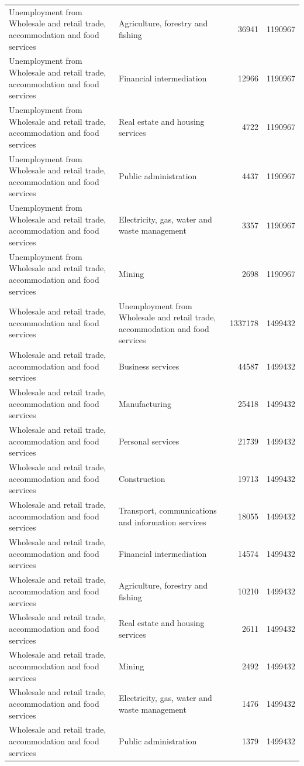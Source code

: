 \begin{longtable}{llrr}
Unemployment from Wholesale and retail trade, accommodation and food services & Agriculture, forestry and fishing & 36941 & 1190967 \\
Unemployment from Wholesale and retail trade, accommodation and food services & Financial intermediation & 12966 & 1190967 \\
Unemployment from Wholesale and retail trade, accommodation and food services & Real estate and housing services & 4722 & 1190967 \\
Unemployment from Wholesale and retail trade, accommodation and food services & Public administration & 4437 & 1190967 \\
Unemployment from Wholesale and retail trade, accommodation and food services & Electricity, gas, water and waste management & 3357 & 1190967 \\
Unemployment from Wholesale and retail trade, accommodation and food services & Mining & 2698 & 1190967 \\
Wholesale and retail trade, accommodation and food services & Unemployment from Wholesale and retail trade, accommodation and food services & 1337178 & 1499432 \\
Wholesale and retail trade, accommodation and food services & Business services & 44587 & 1499432 \\
Wholesale and retail trade, accommodation and food services & Manufacturing & 25418 & 1499432 \\
Wholesale and retail trade, accommodation and food services & Personal services & 21739 & 1499432 \\
Wholesale and retail trade, accommodation and food services & Construction & 19713 & 1499432 \\
Wholesale and retail trade, accommodation and food services & Transport, communications and information services & 18055 & 1499432 \\
Wholesale and retail trade, accommodation and food services & Financial intermediation & 14574 & 1499432 \\
Wholesale and retail trade, accommodation and food services & Agriculture, forestry and fishing & 10210 & 1499432 \\
Wholesale and retail trade, accommodation and food services & Real estate and housing services & 2611 & 1499432 \\
Wholesale and retail trade, accommodation and food services & Mining & 2492 & 1499432 \\
Wholesale and retail trade, accommodation and food services & Electricity, gas, water and waste management & 1476 & 1499432 \\
Wholesale and retail trade, accommodation and food services & Public administration & 1379 & 1499432 \\
\end{longtable}

